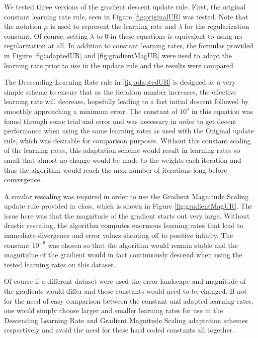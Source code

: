 \documentclass[runningheads]{llncs_2}
\begin{document}
We tested three versions of the gradient descent update rule. First, the original constant learning rate rule, seen in Figure \ref{fig:originalUR} was tested. Note that the notation $\mu$ is used to represent the learning rate and $\lambda$ for the regularization constant. Of course, setting $\lambda$ to 0 in these equations is equivalent to using no regularization at all. In addition to constant learning rates, the formulas provided in Figure \ref{fig:adaptedUR} and \ref{fig:gradientMagUR} were used to adapt the learning rate prior to use in the update rule and the results were compared.

The Descending Learning Rate rule in \ref{fig:adaptedUR} is designed as a very simple scheme to ensure that as the iteration number increases, the effective learning rate will decrease, hopefully leading to a fast initial descent followed by smoothly approaching a minimum error. The constant of $10^{4}$ in this equation was found through some trial and error and was necessary in order to get decent performance when using the same learning rates as used with the Original update rule, which was desirable for comparison purposes. Without this constant scaling of the learning rates, this adaptation scheme would result in learning rates so small that almost no change would be made to the weights each iteration and thus the algorithm would reach the max number of iterations long before convergence. 

A similar rescaling was required in order to use the Gradient Magnitude Scaling update rule provided in class, which is shown in Figure \ref{fig:gradientMagUR}. The issue here was that the magnitude of the gradient starts out very large. Without drastic rescaling, the algorithm computes enormous learning rates that lead to immediate divergence and error values shooting off to positive infinity. The constant $10^{-6}$ was chosen so that the algorithm would remain stable and the magnitidue of the gradient would in fact continuously descend when using the tested learning rates on this dataset. 

Of course if a different dataset were used the error landscape and magnitude of the gradients would differ and these constants would need to be changed. If not for the need of easy comparison between the constant and adapted learning rates, one would simply choose larger and smaller learning rates for use in the Descending Learning Rate and Gradient Magnitude Scaling adaptation schemes respectively and avoid the need for these hard coded constants all together.   
\end{document}
